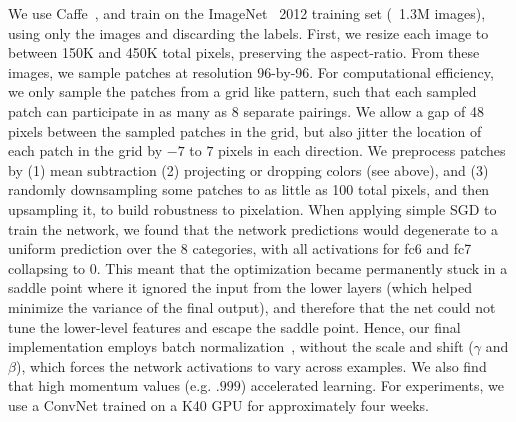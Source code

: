 \documentclass[10pt,twocolumn,letterpaper]{article}
\begin{document}
 We use Caffe~\cite{jia2014caffe}, and train on the ImageNet~\cite{deng2009imagenet} 2012 training set (~1.3M images), using only the images and discarding the labels. First, we resize each image to between 150K and 450K total pixels, preserving the aspect-ratio. From these images, we sample patches at resolution 96-by-96. For computational efficiency, we only sample the patches from a grid like pattern, such that each sampled patch can participate in as many as 8 separate pairings. We allow a gap of 48 pixels between the sampled patches in the grid, but also jitter the location of each patch in the grid by $-7$ to $7$ pixels in each direction.
We preprocess patches by (1) mean subtraction
(2) projecting or dropping colors (see above), and (3) randomly downsampling some patches to as little as 100 total pixels, and then upsampling it, to build robustness to pixelation. When applying simple SGD to train the network, we found that the network predictions would degenerate to a uniform prediction over the 8 categories, with all activations for fc6 and fc7 collapsing to 0. This meant that the optimization became permanently stuck in a saddle point where it ignored the input from the lower layers (which helped minimize the variance of the final output), and therefore that the net could not tune the lower-level features and escape the saddle point.  Hence, our final implementation employs batch normalization~\cite{ioffe2015batch}, without the scale and shift ($\gamma$ and $\beta$), which forces the network activations to vary across examples.  We also find that high momentum values (e.g. $.999$) accelerated learning.  For experiments, we use a ConvNet trained on a K40 GPU for approximately four weeks.  
\end{document}
